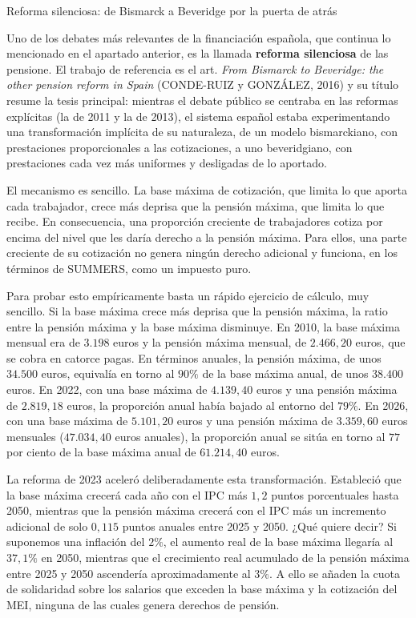 \documentclass[10pt,a4paper]{article}
\begin{document}
Reforma silenciosa: de Bismarck a Beveridge por la puerta de atrás

Uno de los debates más relevantes de la financiación española, que continua lo mencionado en el apartado anterior, es la llamada \textbf{reforma silenciosa} de las pensione. El trabajo de referencia es el art. \textit{From Bismarck to Beveridge: the other pension reform in Spain} (CONDE-RUIZ y GONZÁLEZ, 2016) y su título resume la tesis principal: mientras el debate público se centraba en las reformas explícitas (la de 2011 y la de 2013), el sistema español estaba experimentando una transformación implícita de su naturaleza, de un modelo bismarckiano, con prestaciones proporcionales a las cotizaciones, a uno beveridgiano, con prestaciones cada vez más uniformes y desligadas de lo aportado. 

El mecanismo es sencillo. La base máxima de cotización, que limita lo que aporta cada trabajador, crece más deprisa que la pensión máxima, que limita lo que recibe. En consecuencia, una proporción creciente de trabajadores cotiza por encima del nivel que les daría derecho a la pensión máxima. Para ellos, una parte creciente de su cotización no genera ningún derecho adicional y funciona, en los términos de SUMMERS, como un impuesto puro.


Para probar esto empíricamente basta un rápido ejercicio de cálculo, muy sencillo. Si la base máxima crece más deprisa que la pensión máxima, la ratio entre la pensión máxima y la base máxima disminuye. En 2010, la base máxima mensual era de $3.198$ euros y la pensión máxima mensual, de $2.466,20$ euros, que se cobra en catorce pagas. En términos anuales, la pensión máxima, de unos $34.500$ euros, equivalía en torno al $90\%$ de la base máxima anual, de unos $38.400$ euros. En 2022, con una base máxima de $4.139,40$ euros y una pensión máxima de $2.819,18$ euros, la proporción anual había bajado al entorno del $79\%$. En 2026, con una base máxima de $5.101,20$ euros y una pensión máxima de $3.359,60$ euros mensuales ($47.034,40$ euros anuales), la proporción anual se sitúa en torno al $77$ por ciento de la base máxima anual de $61.214,40$ euros. 

La reforma de 2023 aceleró deliberadamente esta transformación. Estableció que la base máxima crecerá cada año con el IPC más $1,2$ puntos porcentuales hasta 2050, mientras que la pensión máxima crecerá con el IPC más un incremento adicional de solo $0,115$ puntos anuales entre 2025 y 2050. ¿Qué quiere decir? Si suponemos una inflación del $2\%$, el aumento real de la base máxima llegaría al $37,1\%$ en 2050, mientras que el crecimiento real acumulado de la pensión máxima entre 2025 y 2050 ascendería aproximadamente al $3\%$. A ello se añaden la cuota de solidaridad sobre los salarios que exceden la base máxima y la cotización del MEI, ninguna de las cuales genera derechos de pensión.
\end{document}
